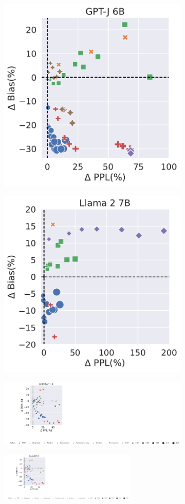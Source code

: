\documentclass[letterpaper]{article} %
\begin{document}
\begin{figure}[t]
\begin{subfigure}
     \end{subfigure}
    \begin{subfigure}
    \centering    \includegraphics[width=0.305\linewidth]{figures/camera_Ready_gender_bias_red_GPT-J_6_B_gender_and_sex_2.pdf}
     \end{subfigure}
    \begin{subfigure}
    \centering    \includegraphics[width=0.31\linewidth]{figures/camera_Ready_gender_bias_red_Llama_2_7_B_gender_and_sex_2.pdf}
     \end{subfigure}
      \begin{subfigure}
    \centering    \includegraphics[clip, trim=0cm 0.295cm 19cm 14.8cm, width=1.0\textwidth]{figures/camera_Ready_gender_bias_red_DistilGPT-2_gender_and_sex_legend.pdf}
     \end{subfigure}
    \begin{subfigure}
    \centering    \includegraphics[clip, trim=24.8cm 0.29cm 0.15cm 14.75cm, width=0.71\textwidth]{figures/camera_Ready_gender_bias_red_DistilGPT-2_gender_and_sex_legend.pdf}
     \end{subfigure}


\end{figure}
\end{document}
